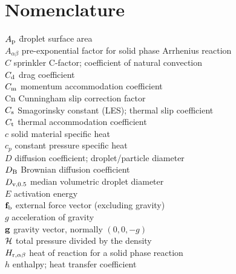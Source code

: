 

\chapter{Nomenclature}
\label{nomenclature}

\begin{tabbing}
$A_{\rm p}$ \hspace{1in}  \= droplet surface area \\
$A_{\alpha\beta}$         \> pre-exponential factor for solid phase Arrhenius reaction \\
$C$                       \> sprinkler C-factor; coefficient of natural convection \\
$C_{\rm d}$               \> drag coefficient \\
$C_{\rm m}$               \> momentum accommodation coefficient \\
Cn                        \> Cunningham slip correction factor \\
$C_{\rm s}$               \> Smagorinsky constant (LES); thermal slip coefficient  \\
$C_{\rm t}$               \> thermal accommodation coefficient \\
$c$                       \> solid material specific heat \\
$c_p$                     \> constant pressure specific heat \\
$D$                       \> diffusion coefficient; droplet/particle diameter   \\
$D_{\rm B}$               \> Brownian diffusion coefficient \\
$D_{\rm v,0.5}$           \> median volumetric droplet diameter \\
$E$                       \> activation energy \\
${\mathbf{f}}_{\rm b}$            \> external force vector (excluding gravity) \\
$g$                       \> acceleration of gravity \\
${\mathbf{g}}$                     \> gravity vector, normally $(0,0,-g)$ \\
$\mathcal{H}$                  \> total pressure divided by the density \\
$H_{{\rm r},\alpha\beta}$ \> heat of reaction for a solid phase reaction \\
$h$                       \> enthalpy; heat transfer coefficient   \\

\end{tabbing}
